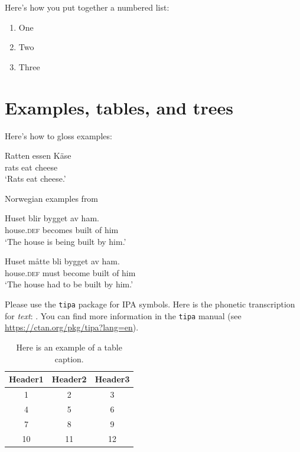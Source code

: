 \documentclass[
  journal=Notes,
  manuscript=for-review,
  year=2023,
  volume=x:x,
]{continua-journal}
\begin{document}
\noindent Here's how you put together a numbered list:

\begin{enumerate}
    \item One
    \item Two
    \item Three
\end{enumerate}

\section{Examples, tables, and trees}

Here's how to gloss examples: 

\begin{exe}
    \ex \gll Ratten essen K\"ase \\
             rats eat cheese \\
        \glt `Rats eat cheese.' 

    \ex Norwegian examples from \citep[154]{fabregas2020passives}
        \begin{xlist}
            \ex \gll Huset blir bygget av ham. \\
                     house.\textsc{def} becomes built of him \\
                \glt `The house is being built by him.'

            \ex \gll Huset m\aa tte bli bygget av ham. \\
                     house.\textsc{def} must become built of him \\
                \glt `The house had to be built by him.' 
        \end{xlist}
\end{exe}



\noindent Please use the \texttt{tipa} package for IPA symbols. Here is the phonetic transcription for \textit{text}: . You can find more information in the \texttt{tipa} manual (see \url{https://ctan.org/pkg/tipa?lang=en}). 


\begin{table}[ht]
    \centering
    \begin{tabular}{ccc}
        Header1 & Header2 & Header3 \\\hline
        1 & 2 & 3 \\ 
        4 & 5 & 6 \\
         7 & 8 & 9 \\
         10 & 11 & 12 \\\hline
    \end{tabular}
    \caption{Here is an example of a table caption.}
    \label{tab:example-table}
\end{table}
\end{document}
